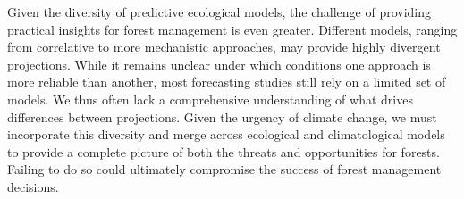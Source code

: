 \documentclass[11pt,letter]{article}
\begin{document}
Given the diversity of predictive ecological models, the challenge of providing practical insights for forest management is even greater. Different models, ranging from correlative to more mechanistic approaches, may provide highly divergent projections. While it remains unclear under which conditions one approach is more reliable than another, most forecasting studies still rely on a limited set of models. We thus often lack a comprehensive understanding of what drives differences between projections. Given the urgency of climate change, we must incorporate this diversity and merge across ecological and climatological models to provide a complete picture of both the threats and opportunities for forests. Failing to do so could ultimately compromise the success of forest management decisions.


\end{document}
